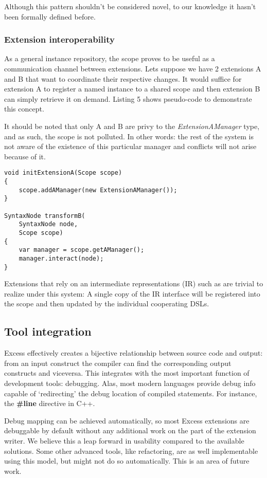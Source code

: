 \documentclass[conference]{IEEEtran}
\begin{document}
Although this pattern shouldn't be considered novel, to our knowledge it hasn't been formally defined before.

\subsubsection{Extension interoperability}
As a general instance repository, the scope proves to be useful as a communication channel between extensions. Lets suppose we have 2 extensions A and B that want to coordinate their respective changes. It would suffice for extension 
A to register a named instance to a shared scope and then extension B can simply retrieve it on demand. Listing 5 shows pseudo-code to demonstrate this concept.

It should be noted that only A and B are privy to the \textit{ExtensionAManager} type, and as such, the scope is not polluted. In other words: the rest of the system is not aware of the existence of this particular manager and conflicts will not arise because of it.

\begin{lstlisting}[caption=Seamless extension interaction, captionpos= b, basicstyle=\small]
void initExtensionA(Scope scope)
{
    scope.addAManager(new ExtensionAManager());
} 

SyntaxNode transformB(
	SyntaxNode node, 
	Scope scope)
{
    var manager = scope.getAManager();
    manager.interact(node);
}
\end{lstlisting}

Extensions that rely on an intermediate representations (IR) such as \cite{Sujeeth} are trivial to realize under this system: A single copy of the IR interface will be registered into the scope and then updated by the individual cooperating DSLs.  

\subsection{Tool integration}

Excess effectively creates a bijective relationship between source code and output: from an input construct the compiler can find the corresponding output constructs and viceversa. This integrates with the most important function of development tools: debugging. 
Alas, most modern languages provide debug info capable of `redirecting' the debug location of compiled statements. For instance, the \textbf{\#line} directive in C++.

Debug mapping can be achieved automatically, so most Excess extensions are debuggable by default without any additional work on the part of the extension writer. We believe this a leap forward in usability compared to the available solutions. 
Some other advanced tools, like refactoring, are as well implementable using this model, but might not do so automatically. This is an area of future work.
\end{document}
